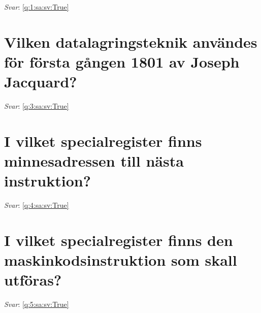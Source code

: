 \documentclass[a4paper,11pt,oneside]{book}
\begin{document}
\begin{sloppypar}
\vspace{2cm}

\noindent\makebox[\textwidth]{\hrulefill}

\vspace{1cm}

\textit{Svar}: \autoref{q:1:sa:sv:True}



\section{Vilken datalagringsteknik anv\"andes f\"or f\"orsta g\r{a}ngen 1801 av Joseph Jacquard?}

\label{q:3:sa:sv:False}

\vspace{2cm}

\noindent\makebox[\textwidth]{\hrulefill}

\vspace{1cm}

\textit{Svar}: \autoref{q:3:sa:sv:True}



\section{I vilket specialregister finns minnesadressen till n\"asta instruktion?}

\label{q:4:sa:sv:False}

\vspace{2cm}

\noindent\makebox[\textwidth]{\hrulefill}

\vspace{1cm}

\textit{Svar}: \autoref{q:4:sa:sv:True}



\section{I vilket specialregister finns den maskinkodsinstruktion som skall utf\"oras?}

\label{q:5:sa:sv:False}

\vspace{2cm}

\noindent\makebox[\textwidth]{\hrulefill}

\vspace{1cm}

\textit{Svar}: \autoref{q:5:sa:sv:True}




\end{sloppypar}
\end{document}
